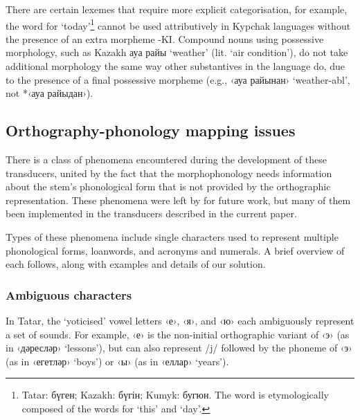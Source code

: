 \documentclass[a4paper,11pt,twocolumn]{article}
\newcommand{\gmk}[1]{{\qgmk #1}}
\begin{document}
There are certain lexemes that require more explicit categorisation, for example, the word 
for `today'\footnote{Tatar: бүген; Kazakh: бүгін; Kumyk: бугюн. The word is etymologically composed of the words for `this' and `day'.} 
cannot be used attributively in Kypchak languages without the presence of an extra morpheme -KI. Compound nouns
using possessive morphology, such as Kazakh ауа райы `weather' (lit. `air condition'), do not take additional morphology the same way other substantives in the language do, due to the presence of a final possessive morpheme (e.g., ‹ауа райынан› `weather-\gmk{abl}', not *‹ауа райыдан›). %


\subsection{Orthography-phonology mapping issues}

There is a class of phenomena encountered during the development of these transducers, united by the fact that the morphophonology needs information about the stem's phonological form that is not provided by the orthographic representation.  These phenomena were left by \citet{washington2012} for future work, but many of them been implemented in the transducers described in the current paper.

Types of these phenomena include single characters used to represent multiple phonological forms, loanwords, and acronyms and numerals.  A brief overview of each follows, along with examples and details of our solution.

\subsubsection{Ambiguous characters}
In Tatar, the `yoticised' vowel letters ‹е›, ‹я›, and ‹ю› each ambiguously represent a set of sounds.  For example, ‹е› is the non-initial orthographic variant of ‹э› (as in ‹дәресләр› `lessons'), but can also represent /j/ followed by the phoneme of ‹э› (as in ‹егетләр› `boys') or ‹ы› (as in ‹еллар› `years').
\end{document}
